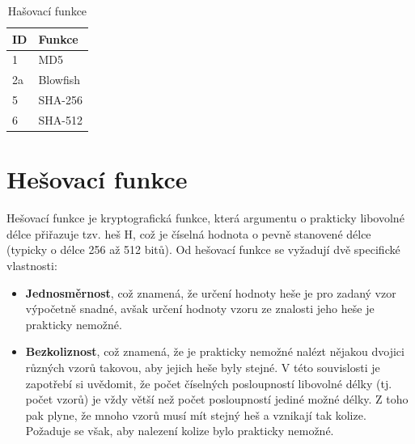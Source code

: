 \begin{table}[!ht]
  \begin{center}
	\caption{Hašovací funkce}
    \label{tab:Hash funkce}
    \begin{tabular}{|l|l|} 
    	  \hline
      \textbf{ID} & \textbf{Funkce} \\
      \hline

	  1  &  MD5\\
	  2a &  Blowfish\\
	  5  &  SHA-256\\
      6  &  SHA-512\\

      \hline
    \end{tabular}
  \end{center}
\end{table}


\section{Hešovací funkce}


Hešovací funkce je kryptografická funkce, která argumentu o prakticky libovolné délce přiřazuje tzv. heš H, což je číselná hodnota o pevně stanovené délce (typicky o délce 256 až 512 bitů). 
Od hešovací funkce se vyžadují dvě specifické vlastnosti:

\begin{itemize}
	\item \textbf{Jednosměrnost}, což znamená, že určení hodnoty heše je pro zadaný vzor výpočetně snadné, avšak určení hodnoty vzoru ze znalosti jeho heše je prakticky nemožné.
	\item \textbf{Bezkoliznost}, což znamená, že je prakticky nemožné nalézt nějakou dvojici různých vzorů takovou, aby jejich heše byly stejné. V této souvislosti je zapotřebí si uvědomit, že počet číselných posloupností libovolné délky (tj. počet vzorů) je vždy větší než počet posloupností jediné možné délky. Z toho pak plyne, že mnoho vzorů musí mít stejný heš a vznikají tak kolize. Požaduje se však, aby nalezení kolize bylo prakticky nemožné.
\end{itemize}

